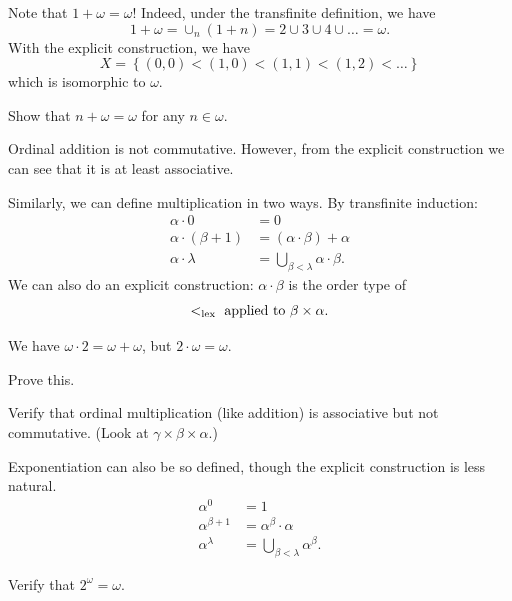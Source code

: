 \begin{example}
	Note that $1 + \omega = \omega$!
	Indeed, under the transfinite definition, we have
	\[ 1 + \omega = \cup_n (1+n) = 2 \cup 3 \cup 4 \cup \dots = \omega. \]
	With the explicit construction, we have
	\[ X = \left\{ (0,0) < (1,0) < (1,1) < (1,2) < \dots \right\} \]
	which is isomorphic to $\omega$.
\end{example}
\begin{exercise}
	Show that $n+\omega = \omega$ for any $n \in \omega$.
\end{exercise}

\begin{remark}
	Ordinal addition is not commutative.
	However, from the explicit construction
	we can see that it is at least associative.
\end{remark}

Similarly, we can define multiplication in two ways.
By transfinite induction:
\begin{align*}
	\alpha \cdot 0 &= 0 \\
	\alpha \cdot (\beta + 1) &= (\alpha \cdot \beta) + \alpha \\
	\alpha \cdot \lambda &= \bigcup_{\beta < \lambda} \alpha \cdot \beta.
\end{align*}
We can also do an explicit construction: $\alpha \cdot \beta$
is the order type of
\[ <_{\text{lex}} \text{ applied to } \beta \times \alpha. \]
\begin{example}
	We have $\omega \cdot 2 = \omega + \omega$,
	but $2 \cdot \omega = \omega$.
\end{example}
\begin{exercise}
	Prove this.
\end{exercise}
\begin{exercise}
	Verify that ordinal multiplication
	(like addition) is associative but not commutative.
	(Look at $\gamma \times \beta \times \alpha$.)
\end{exercise}

Exponentiation can also be so defined, though the explicit construction is less natural.
\begin{align*}
	\alpha^0 &= 1 \\
	\alpha^{\beta+1} &= \alpha^{\beta} \cdot \alpha \\
	\alpha^{\lambda} &= \bigcup_{\beta < \lambda} \alpha^\beta.
\end{align*}
\begin{exercise}
	Verify that $2^\omega = \omega$.
\end{exercise}


